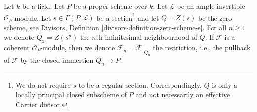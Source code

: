 \medskip\noindent
Let $k$ be a field. Let $P$ be a proper scheme over $k$.
Let $\mathcal{L}$ be an ample invertible $\mathcal{O}_P$-module.
Let $s \in \Gamma(P, \mathcal{L})$ be a section\footnote{We do not
require $s$ to be a regular section. Correspondingly, $Q$ is only
a locally principal closed subscheme of $P$ and not necessarily an effective
Cartier divisor.} and let
$Q = Z(s)$ be the zero scheme, see
Divisors, Definition \ref{divisors-definition-zero-scheme-s}.
For all $n \geq 1$ we denote $Q_n = Z(s^n)$
the $n$th infinitesimal neighbourhood of $Q$.
If $\mathcal{F}$ is a coherent $\mathcal{O}_P$-module, then we denote
$\mathcal{F}_n = \mathcal{F}|_{Q_n}$ the restriction, i.e.,
the pullback of $\mathcal{F}$ by the closed immersion
$Q_n \to P$.
